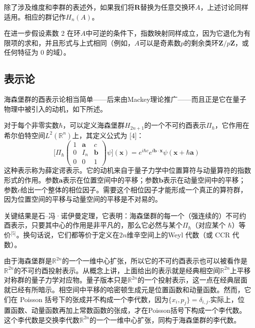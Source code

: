 除了涉及维度和李群的表述外，如果我们将$\mathbf{R}$替换为任意交换环$A$，上述讨论同样适用。相应的群记作$H_{n}(A)$。

在进一步假设素数 2 在环$A$中可逆的条件下，指数映射同样成立，因为它退化为有限项的求和，并且形式与上式相同（例如，$A$可以是奇素数$p$的剩余类环$\mathbf{Z}/p\mathbf{Z}$，或任何特征为 0 的域）。
\subsection{表示论}
海森堡群的酉表示论相当简单——后来由Mackey理论推广——而且正是它在量子物理中被引入的动机，如下所述。

对于每个非零实数$\hbar$，可以定义海森堡群$H_{2n+1}$的一个不可约酉表示$\Pi_{\hbar}$，它作用在希尔伯特空间$L^{2}(\mathbb{R}^{n})$上，其定义公式为 [4]：
$$
\bigg[\Pi_{\hbar}
\begin{pmatrix}
1 & \mathbf{a} & c \\
0 & I_{n} & \mathbf{b} \\
0 & 0 & 1
\end{pmatrix}
\psi \bigg](\mathbf{x})
=
e^{i\hbar c} e^{i \mathbf{b}\cdot \mathbf{x}} \psi(\mathbf{x} + \hbar \mathbf{a})~
$$
这种表示称为薛定谔表示。它的动机来自于量子力学中位置算符与动量算符的指数形式的作用。参数$\mathbf{a}$表示在位置空间中的平移；参数$\mathbf{b}$表示在动量空间中的平移；参数$c$给出一个整体的相位因子。需要这个相位因子才能形成一个真正的算符群，因为位置空间的平移与动量空间的平移是不对易的。

关键结果是石–冯·诺伊曼定理，它表明：海森堡群的每一个（强连续的）不可约酉表示，只要其中心的作用是非平凡的，那么它必然与某个$\Pi_{\hbar}$（对应某个 $\hbar$）等价\(^\text{[5]}\)。换句话说，它们都等价于定义在$2n$维辛空间上的Weyl 代数（或 CCR 代数）。

由于海森堡群是$\mathbb{R}^{2n}$的一个一维中心扩张，所以它的不可约酉表示也可以被看作是$\mathbb{R}^{2n}$的不可约酉投射表示。从概念上讲，上面给出的表示就是经典相空间$\mathbb{R}^{2n}$上平移对称群的量子力学对应物。量子版本只是$\mathbb{R}^{2n}$的一个投射表示，这一点在经典层面就已经有所暗示。相空间中平移的哈密顿生成元是位置函数和动量函数。然而，它们在 Poisson 括号下的张成并不构成一个李代数，因为$\{x_{i}, p_{j}\} = \delta_{i,j}$.实际上，位置函数、动量函数再加上常数函数的张成，才在Poisson括号下构成一个李代数。这个李代数是交换李代数$\mathbb{R}^{2n}$的一个一维中心扩张，同构于海森堡群的李代数。
